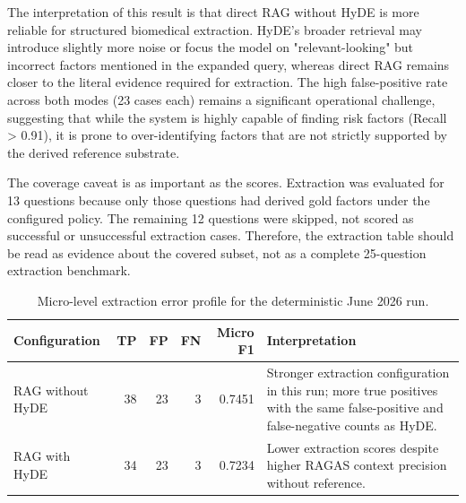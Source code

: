 The interpretation of this result is that direct RAG without HyDE is more reliable for structured biomedical extraction. HyDE's broader retrieval may introduce slightly more noise or focus the model on "relevant-looking" but incorrect factors mentioned in the expanded query, whereas direct RAG remains closer to the literal evidence required for extraction. The high false-positive rate across both modes (23 cases each) remains a significant operational challenge, suggesting that while the system is highly capable of finding risk factors (Recall > 0.91), it is prone to over-identifying factors that are not strictly supported by the derived reference substrate.

The coverage caveat is as important as the scores. Extraction was evaluated for 13 questions because only those questions had derived gold factors under the configured policy. The remaining 12 questions were skipped, not scored as successful or unsuccessful extraction cases. Therefore, the extraction table should be read as evidence about the covered subset, not as a complete 25-question extraction benchmark.

\begin{table}[h]
\centering
\small
\caption{Micro-level extraction error profile for the deterministic June 2026 run.}
\label{tab:extraction-error-profile}
\begin{tabular}{lrrrrp{6.2cm}}
\toprule
Configuration & TP & FP & FN & Micro F1 & Interpretation \\
\midrule
RAG without HyDE & 38 & 23 & 3 & 0.7451 & Stronger extraction configuration in this run; more true positives with the same false-positive and false-negative counts as HyDE. \\
RAG with HyDE & 34 & 23 & 3 & 0.7234 & Lower extraction scores despite higher RAGAS context precision without reference. \\
\bottomrule
\end{tabular}
\end{table}

